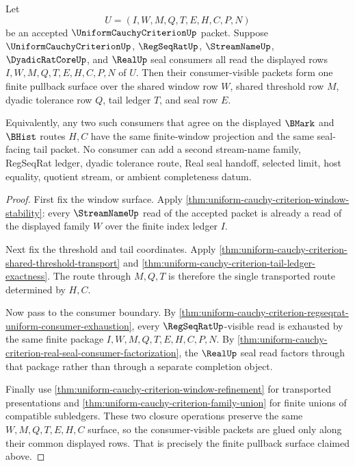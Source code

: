 \begin{theorem}
\label{thm:uniform-cauchy-criterion-realup-regseqrat-shared-window-pullback}
Let
$$
U=(I,W,M,Q,T,E,H,C,P,N)
$$
be an accepted $\UniformCauchyCriterionUp$ packet. Suppose $\UniformCauchyCriterionUp$, $\RegSeqRatUp$, $\StreamNameUp$, $\DyadicRatCoreUp$, and $\RealUp$ seal consumers all read the displayed rows $I,W,M,Q,T,E,H,C,P,N$ of $U$. Then their consumer-visible packets form one finite pullback surface over the shared window row $W$, shared threshold row $M$, dyadic tolerance row $Q$, tail ledger $T$, and seal row $E$.

Equivalently, any two such consumers that agree on the displayed $\BMark$ and $\BHist$ routes $H,C$ have the same finite-window projection and the same seal-facing tail packet. No consumer can add a second stream-name family, RegSeqRat ledger, dyadic tolerance route, Real seal handoff, selected limit, host equality, quotient stream, or ambient completeness datum.
\end{theorem}
\begin{proof}
First fix the window surface. Apply \autoref{thm:uniform-cauchy-criterion-window-stability}: every $\StreamNameUp$ read of the accepted packet is already a read of the displayed family $W$ over the finite index ledger $I$.

Next fix the threshold and tail coordinates. Apply \autoref{thm:uniform-cauchy-criterion-shared-threshold-transport} and \autoref{thm:uniform-cauchy-criterion-tail-ledger-exactness}. The route through $M,Q,T$ is therefore the single transported route determined by $H,C$.

Now pass to the consumer boundary. By \autoref{thm:uniform-cauchy-criterion-regseqrat-uniform-consumer-exhaustion}, every $\RegSeqRatUp$-visible read is exhausted by the same finite package $I,W,M,Q,T,E,H,C,P,N$. By \autoref{thm:uniform-cauchy-criterion-real-seal-consumer-factorization}, the $\RealUp$ seal read factors through that package rather than through a separate completion object.

Finally use \autoref{thm:uniform-cauchy-criterion-window-refinement} for transported presentations and \autoref{thm:uniform-cauchy-criterion-family-union} for finite unions of compatible subledgers. These two closure operations preserve the same $W,M,Q,T,E,H,C$ surface, so the consumer-visible packets are glued only along their common displayed rows. That is precisely the finite pullback surface claimed above.
\end{proof}

